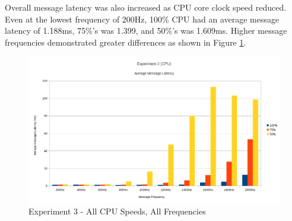 \documentclass[../dissertation.tex]{subfiles}
\begin{document}
Overall message latency was also increased as CPU core clock speed reduced. Even at the lowest frequency of 200Hz, 100\% CPU had an average message latency of 1.188ms, 75\%'s was 1.399, and 50\%'s was 1.609ms. Higher message frequencies demonstrated greater differences as shown in Figure \ref{exp3-averages}.

\begin{figure}[H]
\centering
\includegraphics[width=\textwidth]{images/experiment3/average_per_frequency_graph.png}
\caption{Experiment 3 - All CPU Speeds, All Frequencies}
\label{exp3-averages}
\end{figure}
\end{document}
